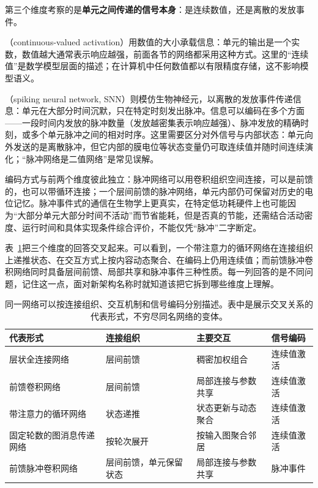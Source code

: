 第三个维度考察的是\textbf{单元之间传递的信号本身}：是连续数值，还是离散的发放事件。

（continuous-valued activation）用数值的大小承载信息：单元的输出是一个实数，数值越大通常表示响应越强，前面各节的网络都采用这种方式。这里的“连续值”是数学模型层面的描述；在计算机中任何数值都以有限精度存储，这不影响模型语义。

（spiking neural network, SNN）则模仿生物神经元，以离散的发放事件传递信息：单元在大部分时间沉默，只在特定时刻发出脉冲。信息可以编码在多个方面——一段时间内发放的脉冲数量（发放越密集表示响应越强）、脉冲发放的精确时刻，或多个单元脉冲之间的相对时序。这里需要区分对外信号与内部状态：单元向外发送的是离散脉冲，但它内部的膜电位等状态变量仍可取连续值并随时间连续演化；“脉冲网络是二值网络”是常见误解。

编码方式与前两个维度彼此独立：脉冲网络可以用卷积组织空间连接，可以是前馈的，也可以带循环连接；一个层间前馈的脉冲网络，单元内部仍可保留对历史的电位记忆。脉冲事件式的通信在生物学上更真实，在特定低功耗硬件上也可能因为“大部分单元大部分时间不活动”而节省能耗，但是否真的节能，还需结合活动密度、运行时间和具体实现条件综合评价，不能仅凭“脉冲”二字断定。

表~\ref{tab:neural-cross-classification}把三个维度的回答交叉起来。可以看到，一个带注意力的循环网络在连接组织上递推状态、在交互方式上按内容动态聚合、在编码上仍用连续值；而前馈脉冲卷积网络同时具备层间前馈、局部共享和脉冲事件三种性质。每一列回答的是不同问题，记住这一点，面对新架构名称时就知道该把它拆到哪些维度上理解。
\begin{table}[htbp]
  \centering
  \small
  \begin{tabularx}{\linewidth}{@{}>{\RaggedRight\arraybackslash}p{45mm}>{\RaggedRight\arraybackslash}p{42mm}>{\RaggedRight\arraybackslash}X>{\RaggedRight\arraybackslash}p{26mm}@{}}
    \toprule
    \textbf{代表形式} & \textbf{连接组织} & \textbf{主要交互} & \textbf{信号编码} \\
    \midrule
    层状全连接网络 & 层间前馈 & 稠密加权组合 & 连续值激活 \\
    前馈卷积网络 & 层间前馈 & 局部连接与参数共享 & 连续值激活 \\
    带注意力的循环网络 & 状态递推 & 状态更新与动态聚合 & 连续值激活 \\
    固定轮数的图消息传递网络 & 按轮次展开 & 按输入图聚合邻居 & 连续值激活 \\
    前馈脉冲卷积网络 & 层间前馈，单元保留状态 & 局部连接与参数共享 & 脉冲事件 \\
    \bottomrule
  \end{tabularx}
  \caption{同一网络可以按连接组织、交互机制和信号编码分别描述。表中是展示交叉关系的代表形式，不穷尽同名网络的变体。}
  \label{tab:neural-cross-classification}
\end{table}

